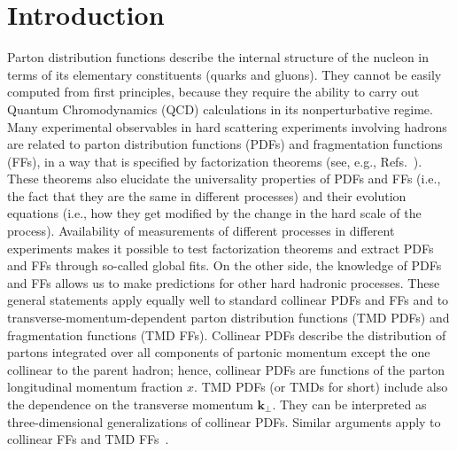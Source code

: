 \documentclass[aps,preprintnumbers,showpacs,nofootinbib,superscriptaddress,floatfix]{revtex4}
\newcommand{\T}{\perp}
\begin{document}

\maketitle
\tableofcontents

\newpage
\section{Introduction}
\label{s:intro}

Parton distribution functions describe the internal structure of the nucleon
in terms of its elementary constituents (quarks and gluons). They cannot be
easily computed from first principles, because they require the ability to
carry out Quantum Chromodynamics (QCD) calculations in its nonperturbative
regime. Many experimental observables in hard scattering experiments
involving hadrons are related to parton distribution functions (PDFs) and
fragmentation functions (FFs), in a way that is specified by factorization
theorems (see, e.g., Refs.~\cite{Collins:1989gx,Collins:2011zzd}). 
These theorems also elucidate the universality properties of PDFs and FFs
(i.e., the fact that they are the same in different processes) 
and their evolution equations (i.e., how they get modified by the change in
the hard scale of the process). 
Availability of measurements of different processes in different
experiments makes it possible to test factorization
theorems and extract PDFs and FFs through so-called global fits. 
On the other side, the knowledge of PDFs and FFs allows us
to make predictions for other hard hadronic processes. 
These general statements apply equally well to
standard collinear PDFs and FFs and to transverse-momentum-dependent parton
distribution functions (TMD PDFs) and fragmentation functions (TMD FFs). 
Collinear PDFs
describe the distribution of partons integrated over all components of
partonic momentum except the one collinear to the parent hadron; hence,
collinear PDFs
are functions of the parton longitudinal momentum fraction $x$. 
TMD PDFs (or TMDs for short) 
include also the dependence on the transverse momentum $\bm{k}_{\T}$. 
They can be interpreted as three-dimensional generalizations of collinear PDFs.
Similar arguments apply to collinear FFs and TMD
FFs~\cite{Angeles-Martinez:2015sea}. 
\end{document}

